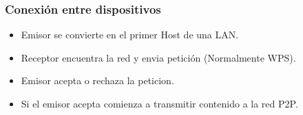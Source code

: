 \begin{frame}
  \frametitle{Conexión entre dispositivos}
  \begin{itemize}
  \item Emisor se convierte en el primer Host de una LAN.
    \pause
  \item Receptor encuentra la red y envia petición (Normalmente WPS).
    \pause
  \item Emisor acepta o rechaza la peticion.
    \pause
  \item Si el emisor acepta comienza a transmitir contenido a la red P2P.
  \end{itemize}
\end{frame}
